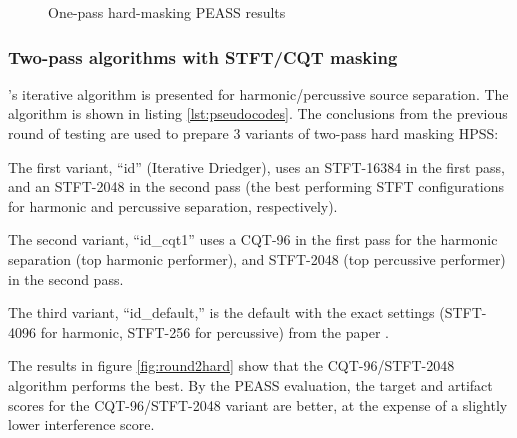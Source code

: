 \documentclass[letter,12pt]{article}
\newenvironment{tight_enumerate}{
\begin{enumerate}
  \setlength{\itemsep}{0pt}
  \setlength{\parskip}{0pt}
}{\end{enumerate}}
\begin{document}
\begin{figure}[ht]
	\centering
	\caption{One-pass hard-masking PEASS results}
	\label{fig:round1hard}
\end{figure}

\vfill
\clearpage

\subsubsection{Two-pass algorithms with STFT/CQT masking}

\citet{driedger}'s iterative algorithm is presented for harmonic/percussive source separation. The algorithm is shown in listing \ref{lst:pseudocodes}. The conclusions from the previous round of testing are used to prepare 3 variants of two-pass hard masking HPSS:
\begin{tight_enumerate}
	\item
		The first variant, ``id'' (Iterative Driedger), uses an STFT-16384 in the first pass, and an STFT-2048 in the second pass (the best performing STFT configurations for harmonic and percussive separation, respectively).
	\item
		The second variant, ``id\_cqt1'' uses a CQT-96 in the first pass for the harmonic separation (top harmonic performer), and STFT-2048 (top percussive performer) in the second pass.
	\item
		The third variant, ``id\_default,'' is the default with the exact settings (STFT-4096 for harmonic, STFT-256 for percussive) from the paper \cite{driedger}.
\end{tight_enumerate}

The results in figure \ref{fig:round2hard} show that the CQT-96/STFT-2048 algorithm performs the best. By the PEASS evaluation, the target and artifact scores for the CQT-96/STFT-2048 variant are better, at the expense of a slightly lower interference score.
\end{document}
